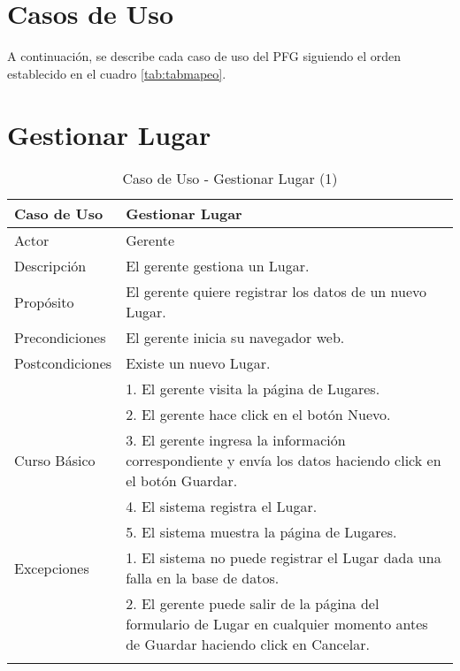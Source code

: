 
\section{Casos de Uso}
A continuación, se describe cada caso de uso del PFG siguiendo el orden establecido en el cuadro \ref{tab:tabmapeo}.
\section{Gestionar Lugar}


\begin{longtable}{@{} p{3cm} p{10cm} @{}} \toprule
    \textbf{Caso de Uso}    & Gestionar Lugar \\ \midrule
    Actor                   & Gerente \\ \cmidrule{1-2}
    Descripción             & El gerente gestiona un Lugar. \\ \cmidrule{1-2}
    Propósito               & El gerente quiere registrar los datos de un nuevo Lugar. \\ \cmidrule{1-2}
    Precondiciones          & El gerente inicia su navegador web. \\ \cmidrule{1-2} 
    Postcondiciones         & Existe un nuevo Lugar. \\ \cmidrule{1-2} 
                            & 1. El gerente visita la página de Lugares. \\ 
                            & 2. El gerente hace click en el botón Nuevo. \\
   Curso Básico             & 3. El gerente ingresa la información correspondiente y envía los datos haciendo click en el botón Guardar. \\
                            & 4. El sistema registra el Lugar. \\ 
                            & 5. El sistema muestra la página de Lugares. \\ \cmidrule{1-2}
    Excepciones             & 1. El sistema no puede registrar el Lugar dada una falla en la base de datos. \\
                            & 2. El gerente puede salir de la página del formulario de Lugar en cualquier momento antes de Guardar haciendo click en Cancelar. \\ \bottomrule
   \caption{Caso de Uso - Gestionar Lugar (1)} \label{tab:tabcu-lug1} \\
   \end{longtable}


